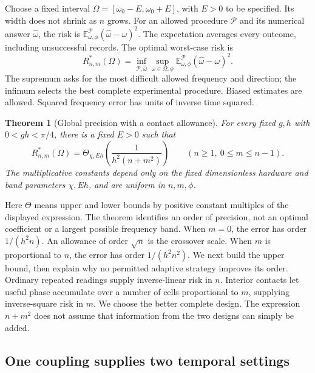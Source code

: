 \documentclass[11pt,a4paper]{article}
\numberwithin{equation}{section}
\newtheorem{theorem}{Theorem}[section]
\theoremstyle{remark}
\begin{document}
Choose a fixed interval $\Omega=[\omega_0-E,\omega_0+E]$, with $E>0$ to be
specified. Its width does not shrink as $n$ grows. For an allowed procedure
$\mathcal P$ and its numerical answer $\widehat\omega$, the risk is
$\mathbb E_{\omega,\phi}^{\mathcal P}(\widehat\omega-\omega)^2$.
The expectation averages every outcome, including unsuccessful records.
The optimal worst-case risk is
\begin{equation}
 R_{n,m}^*(\Omega)=\inf_{\mathcal P,\widehat\omega}
 \sup_{\omega\in\Omega,\phi}
 \mathbb E_{\omega,\phi}^{\mathcal P}
       (\widehat\omega-\omega)^2.
 \label{con:risk}
\end{equation}
The supremum asks for the most difficult allowed frequency and direction;
the infimum selects the best complete experimental procedure. Biased
estimates are allowed. Squared frequency error has units of inverse time
squared.

\begin{theorem}[Global precision with a contact allowance]
For every fixed $g,h$ with $0<gh<\pi/4$, there is a fixed $E>0$ such that
\begin{equation}
 \boxed{R_{n,m}^*(\Omega)
 =\Theta_{\chi,Eh}\!\left(\frac{1}{h^2(n+m^2)}\right)}
 \qquad(n\ge1,\ 0\le m\le n-1).
 \label{con:law}
\end{equation}
The multiplicative constants depend only on the fixed dimensionless
hardware and band parameters $\chi,Eh$, and are uniform in $n,m,\phi$.
\end{theorem}
Here $\Theta$ means upper and lower bounds by positive constant multiples
of the displayed expression. The theorem identifies an order of precision,
not an optimal coefficient or a largest possible frequency band.
When $m=0$, the error has order $1/(h^2n)$. An allowance of order
$\sqrt n$ is the crossover scale. When $m$ is proportional to $n$, the
error has order $1/(h^2n^2)$. We next build the upper bound, then explain
why no permitted adaptive strategy improves its order. Ordinary repeated
readings supply inverse-linear risk in $n$. Interior contacts let useful
phase accumulate over a number of cells proportional to $m$, supplying
inverse-square risk in $m$. We choose the better complete design.
The expression $n+m^2$ does not assume that information from the two
designs can simply be added.

\subsection{One coupling supplies two temporal settings}
\label{con:settings}
\end{document}
